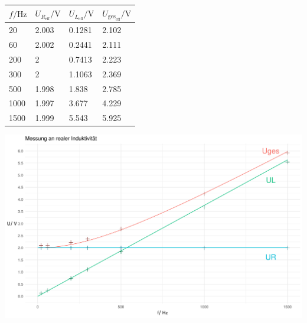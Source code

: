 \documentclass[a4paper, 12pt]{article}
\begin{document}
      \begin{table}[H]
      \begin{center}
      \begin{tabular}{@{}llll@{}}
      \toprule
      $f/\si{\hertz}$   & $U_{R_{\text{eff}}}/\si{\volt}$ & $U_{L_{\text{eff}}}/\si{\volt}$  & $U_{\text{ges}_{\text{eff}}}/\si{\volt}$ \\ \midrule
      20   & 2.003 & 0.1281 & 2.102 \\
      60   & 2.002 & 0.2441 & 2.111 \\
      200  & 2     & 0.7413 & 2.223 \\
      300  & 2     & 1.1063 & 2.369 \\
      500  & 1.998 & 1.838  & 2.785 \\
      1000 & 1.997 & 3.677  & 4.229 \\
      1500 & 1.999 & 5.543  & 5.925 \\ \bottomrule
      \end{tabular}
      \end{center}
      \end{table}

      \begin{center}
        \includegraphics[scale=0.5]{./R/3_1/3_1.pdf}
      \end{center}

     \pagebreak{}
\end{document}
